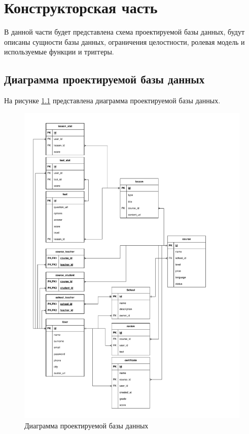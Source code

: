 \chapter{Конструкторская часть}

В данной части будет представлена схема проектируемой базы данных, будут описаны сущности базы данных, ограничения целостности, ролевая модель и используемые функции и триггеры.

\section{Диаграмма проектируемой базы данных}

На рисунке \ref{img:scheme} представлена диаграмма проектируемой базы данных.

\begin{figure}[H]
	\centering
	\includegraphics[height=0.9\textheight]{inc/img/scheme.pdf}
	\caption{Диаграмма проектируемой базы данных}
	\label{img:scheme}
\end{figure}

